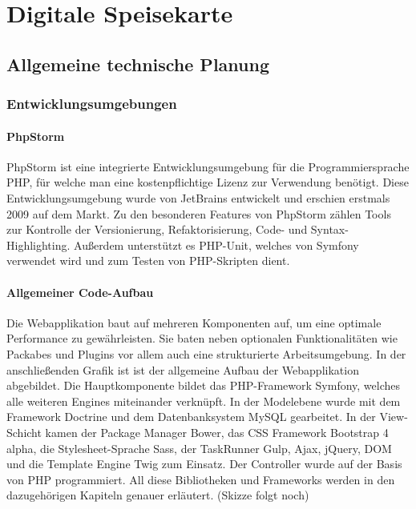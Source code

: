 \chapter{Digitale Speisekarte}
\renewcommand{\kapitelautor}{Autor: Katharina Joksch}

\section{Allgemeine technische Planung}

  \subsection{Entwicklungsumgebungen}

    \subsubsection{PhpStorm}
    
    PhpStorm ist eine integrierte Entwicklungsumgebung für die Programmiersprache PHP, für welche man eine kostenpflichtige Lizenz zur Verwendung benötigt. Diese Entwicklungsumgebung wurde von JetBrains entwickelt und erschien erstmals 2009 auf dem Markt. Zu den besonderen Features von PhpStorm zählen Tools zur Kontrolle der Versionierung, Refaktorisierung, Code- und Syntax-Highlighting. Außerdem unterstützt es PHP-Unit, welches von Symfony verwendet wird und zum Testen von PHP-Skripten dient. 

    \subsubsection{Allgemeiner Code-Aufbau}

	Die Webapplikation baut auf mehreren Komponenten auf, um eine optimale Performance zu gewährleisten. Sie baten neben optionalen Funktionalitäten wie Packabes und Plugins vor allem auch eine strukturierte Arbeitsumgebung.
	In der anschließenden Grafik ist ist der allgemeine Aufbau der Webapplikation abgebildet. Die Hauptkomponente bildet das PHP-Framework Symfony, welches alle weiteren Engines miteinander verknüpft. In der Modelebene wurde mit dem Framework Doctrine und dem Datenbanksystem MySQL gearbeitet. In der View-Schicht kamen der Package Manager Bower, das CSS Framework Bootstrap 4 alpha, die Stylesheet-Sprache Sass, der TaskRunner Gulp, Ajax, jQuery, DOM und die Template Engine Twig zum Einsatz. Der Controller wurde auf der Basis von PHP programmiert. All diese Bibliotheken und Frameworks werden in den dazugehörigen Kapiteln genauer erläutert.
	(Skizze folgt noch)

